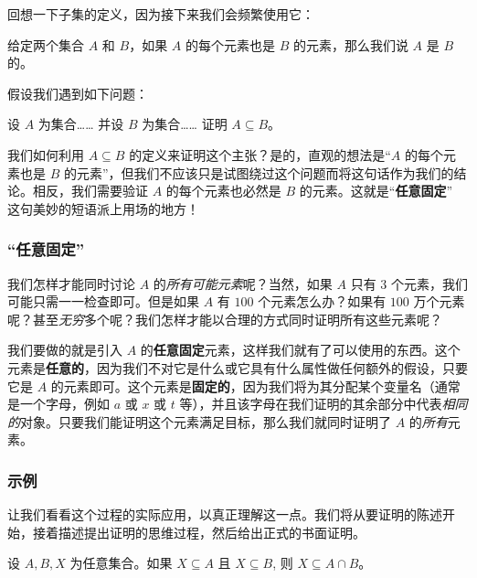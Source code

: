 回想一下子集的定义，因为接下来我们会频繁使用它：

\begin{definition}
    给定两个集合 $A$ 和 $B$，如果 $A$ 的每个元素也是 $B$ 的元素，那么我们说 $A$ 是 $B$ 的。
\end{definition}

假设我们遇到如下问题：
\begin{center}
    设 $A$ 为集合…… 并设 $B$ 为集合…… 证明 $A \subseteq B$。
\end{center}
我们如何利用 $A \subseteq B$ 的定义来证明这个主张？是的，直观的想法是``$A$ 的每个元素也是 $B$ 的元素''，但我们不应该只是试图绕过这个问题而将这句话作为我们的结论。相反，我们需要验证 $A$ 的每个元素也必然是 $B$ 的元素。这就是``\textbf{任意固定}'' 这句美妙的短语派上用场的地方！

\subsubsection*{``任意固定''}

我们怎样才能同时讨论 $A$ 的\emph{所有可能元素}呢？当然，如果 $A$ 只有 $3$ 个元素，我们可能只需一一检查即可。但是如果 $A$ 有 $100$ 个元素怎么办？如果有 $100$ 万个元素呢？甚至\emph{无穷}多个呢？我们怎样才能以合理的方式同时证明所有这些元素呢？

我们要做的就是引入 $A$ 的\textbf{任意固定}元素，这样我们就有了可以使用的东西。这个元素是\textbf{任意的}，因为我们不对它是什么或它具有什么属性做任何额外的假设，只要它是 $A$ 的元素即可。这个元素是\textbf{固定的}，因为我们将为其分配某个变量名（通常是一个字母，例如 $a$ 或 $x$ 或 $t$ 等），并且该字母在我们证明的其余部分中代表\emph{相同的}对象。只要我们能证明这个元素满足目标，那么我们就同时证明了 $A$ 的\emph{所有}元素。

\subsubsection*{示例}

让我们看看这个过程的实际应用，以真正理解这一点。我们将从要证明的陈述开始，接着描述提出证明的思维过程，然后给出正式的书面证明。

\begin{lemma}\label{lemma3.9.1}
    设 $A,B,X$ 为任意集合。如果 $X \subseteq A$ 且 $X \subseteq B$, 则 $X \subseteq A \cap B$。
\end{lemma}

